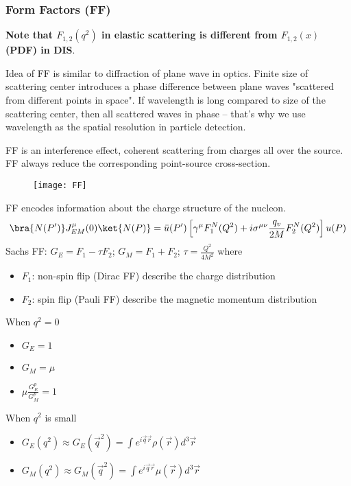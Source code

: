 \subsubsection{Form Factors (FF)}
\textbf{Note that $F_{1,2}(q^2)$ in elastic scattering is different from
$F_{1,2}(x)$ (PDF) in DIS}.

Idea of FF is similar to diffraction of plane wave in optics. Finite size of 
scattering center introduces a phase difference between plane waves "scattered
from different points in space". If wavelength is long compared to size of the
scattering center, then all scattered waves in phase -- that's why we use
wavelength as the spatial resolution in particle detection.

FF is an interference effect, coherent scattering from charges all over the source.
FF always reduce the corresponding point-source cross-section.
\begin{figure}
    \texttt{[image: FF]}
\end{figure}

FF encodes information about the charge structure of the nucleon.
$$ \bra{N(P')} J^\mu_{EM}(0) \ket{N(P)} = \bar{u}(P')\left[ \gamma^\mu F_1^N(Q^2) + i\sigma^{\mu\nu}\frac{q_v}{2M}F_2^N(Q^2) \right] u(P) $$ 
Sachs FF: $G_E = F_1 - \tau F_2$; $G_M = F_1 + F_2$; $\tau = \frac{Q^2}{4M^2}$
where
\begin{itemize}
    \item $F_1$: non-spin flip (Dirac FF) describe the charge distribution
    \item $F_2$: spin flip (Pauli FF) describe the magnetic momentum distribution
\end{itemize}

When $q^2 = 0$
\begin{itemize}
    \item $G_E = 1$
    \item $G_M = \mu$
    \item $\mu \frac{G_E^p}{G_M^p} = 1$
\end{itemize}

When $q^2$ is small
\begin{itemize}
    \item $G_E(q^2) \approx G_E(\vec{q}^2) = \int e^{i\vec{q}\vec{r}} \rho(\vec{r}) d^3\vec{r}$
    \item $G_M(q^2) \approx G_M(\vec{q}^2) = \int e^{i\vec{q}\vec{r}} \mu(\vec{r}) d^3\vec{r}$
\end{itemize}

